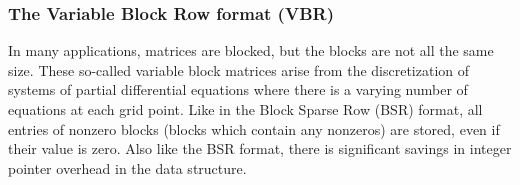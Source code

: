 
\subsubsection{The Variable Block Row format (VBR)}
In many applications, matrices are blocked, but the blocks are not all
the same size.  These so-called variable block matrices arise from the
discretization of systems of partial differential equations where there
is a varying number of equations at each grid point.  Like in the Block
Sparse Row (BSR) format, all entries of nonzero blocks (blocks which
contain any nonzeros) are stored, even if their value is zero.  Also
like the BSR format, there is significant savings in integer pointer
overhead in the data structure.

